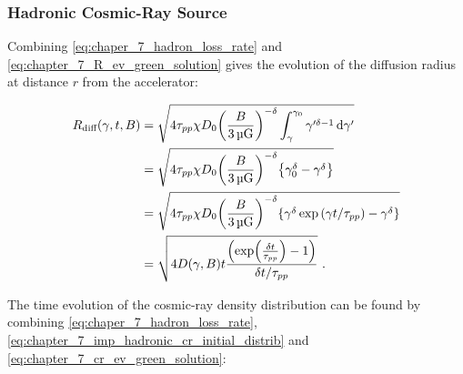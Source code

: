 \subsubsection{Hadronic Cosmic-Ray Source}

Combining \autoref{eq:chaper_7_hadron_loss_rate} and \autoref{eq:chapter_7_R_ev_green_solution} gives the evolution of the diffusion radius at distance $r$ from the accelerator:

\begin{equation}
	\begin{aligned}
		R_\text{diff}\qty(\gamma,t,B)&=\sqrt{4\tau_{pp}\chi D_0\qty(\frac{B}{3\,\si{\micro G}})^{-\delta}\int_\gamma^{\gamma_0}\gamma'^{\delta-1}\dd{\gamma'}} \\
		&=\sqrt{4\tau_{pp}\chi D_0\qty(\frac{B}{3\,\si{\micro G}})^{-\delta}\qty{\gamma_0^\delta-\gamma^\delta}} \\
		&=\sqrt{4\tau_{pp}\chi D_0\qty(\frac{B}{3\,\si{\micro G}})^{-\delta}\qty{\gamma^\delta\exp\qty(\gamma t/\tau_{pp})-\gamma^\delta}} \\
		&=\sqrt{4D\qty(\gamma,B)t\frac{\qty(\exp(\frac{\delta t}{\tau_{pp}})-1)}{\delta t/\tau_{pp}}}\text{ .}
	\end{aligned} \label{eq:chapter_7_Rdiff_hadronic_impulsive}
\end{equation} 

The time evolution of the cosmic-ray density distribution can be found by combining \autoref{eq:chaper_7_hadron_loss_rate}, \autoref{eq:chapter_7_imp_hadronic_cr_initial_distrib} and \autoref{eq:chapter_7_cr_ev_green_solution}:

